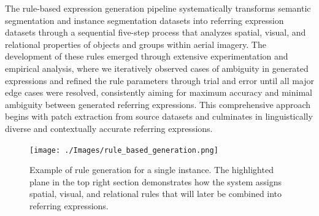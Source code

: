The rule-based expression generation pipeline systematically transforms semantic segmentation and instance segmentation datasets into referring expression datasets through a sequential five-step process that analyzes spatial, visual, and relational properties of objects and groups within aerial imagery. The development of these rules emerged through extensive experimentation and empirical analysis, where we iteratively observed cases of ambiguity in generated expressions and refined the rule parameters through trial and error until all major edge cases were resolved, consistently aiming for maximum accuracy and minimal ambiguity between generated referring expressions. This comprehensive approach begins with patch extraction from source datasets and culminates in linguistically diverse and contextually accurate referring expressions.

\begin{figure}[H]
\centering
\begin{minipage}{0.5\textwidth}
\centering
\texttt{[image: ./Images/rule\_based\_generation.png]}
\end{minipage}%
\begin{minipage}{0.5\textwidth}
\centering
\hspace{-1cm}
\end{minipage}
\caption{Example of rule generation for a single instance. The highlighted plane in the top right section demonstrates how the system assigns spatial, visual, and relational rules that will later be combined into referring expressions.}
\label{fig:rule_example}
\end{figure}

